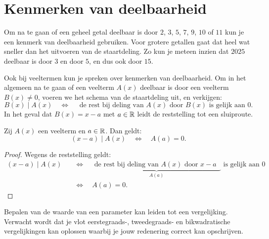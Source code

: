 \documentclass{ximera}
\begin{document}
\section{Kenmerken van deelbaarheid} 

Om na te gaan of een geheel getal deelbaar is door $2$, $3$, $5$, $7$, $9$, $10$ of $11$ kun je een kenmerk van deelbaarheid gebruiken. Voor grotere getallen gaat dat heel wat sneller dan het uitvoeren van de staartdeling. Zo kun je meteen inzien dat $2025$ deelbaar is door $3$ en door $5$, en dus ook door $15$.  

Ook bij veeltermen kun je spreken over kenmerken van deelbaarheid. Om in het algemeen na te gaan of een veelterm $A(x)$ deelbaar is door een veelterm $B(x) \neq 0$, voeren we het schema van de staartdeling uit, en verkijgen:
\[
B(x) \mid A(x) \quad \Leftrightarrow \quad \text{ de rest bij deling van $A(x)$ door $B(x)$ is gelijk aan $0$.}
\] 
In het geval dat $B(x) = x-a$ met $a \in \mathbb{R}$ leidt de reststelling tot een sluiproute.

\begin{theorem} 
Zij $A(x)$ een veelterm en $a \in \mathbb{R}$. Dan geldt:
\[
(x-a) \mid A(x) \quad \Leftrightarrow \quad A(a) = 0.
\]
\end{theorem} 


\begin{proof}

Wegens de reststelling geldt:
\begin{align}
(x-a) \mid A(x) \quad 
& \Leftrightarrow \quad \underbrace{\text{ de rest bij deling van $A(x)$ door $x-a$ }}_{A(a)} \text{ is gelijk aan $0$} \nonumber \\
& \Leftrightarrow \quad A(a) = 0. \tag*{\qedhere}
\end{align}

\end{proof}


Bepalen van de waarde van een parameter kan leiden tot een vergelijking. Verwacht wordt dat je vlot eerstegraads-, tweedegraads- en bikwadratische vergelijkingen kan oplossen waarbij je jouw redenering correct kan opschrijven. 
\end{document}
